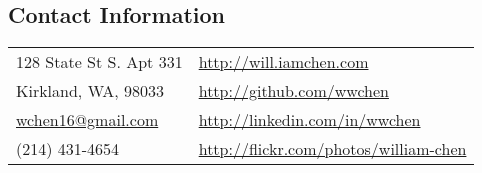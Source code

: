 \documentclass[margin,line]{res}
\begin{document}

\begin{resume}
\section{\sc Contact Information}
\begin{tabular}{@{}p{2.5in}p{4in}}
128 State St S. Apt 331                            & \href{http://will.iamchen.com}{http://will.iamchen.com} \\
Kirkland, WA, 98033                                & \href{http://github.com/wwchen}{http://github.com/wwchen} \\
\href{mailto:wchen16@gmail.com}{wchen16@gmail.com} & \href{http://linkedin.com/in/wwchen}{http://linkedin.com/in/wwchen} \\
(214) 431-4654                                     & \href{http://flickr.com/photos/william-chen}{http://flickr.com/photos/william-chen} \\
\end{tabular}

%
%

\end{resume}
\end{document}
